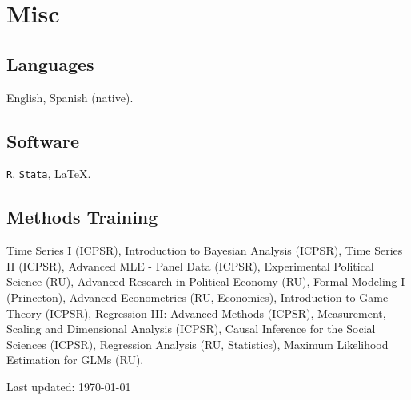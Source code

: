 \documentclass[letterpaper]{article}
\def\footerlink{}
\begin{document}
\section*{Misc}

\subsection*{Languages}
English, Spanish (native).


\subsection*{Software}
\texttt{R}, \texttt{Stata}, \LaTeX.

\subsection*{Methods Training}
Time Series I (ICPSR), Introduction to Bayesian Analysis (ICPSR), Time Series II (ICPSR), Advanced MLE - Panel Data (ICPSR), Experimental Political Science (RU), Advanced Research in Political Economy (RU), Formal Modeling I (Princeton), Advanced Econometrics (RU, Economics), Introduction to Game Theory (ICPSR), Regression III: Advanced Methods (ICPSR), Measurement, Scaling and Dimensional Analysis (ICPSR), Causal Inference for the Social Sciences (ICPSR), Regression Analysis (RU, Statistics), Maximum Likelihood Estimation for GLMs (RU).




\bigskip

\begin{center}
  \begin{footnotesize}
    Last updated: \today \\
    \href{\footerlink}{\texttt{\footerlink}}
  \end{footnotesize}
\end{center}
\end{document}
